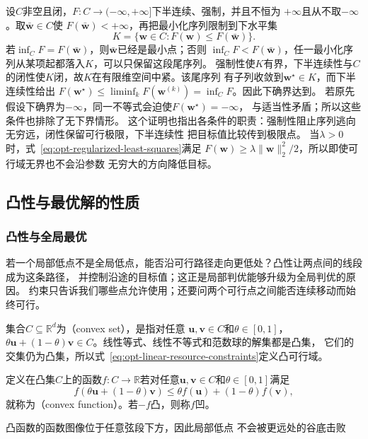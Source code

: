 设$C$非空且闭，$F:C\to(-\infty,+\infty]$下半连续、强制，并且不恒为
$+\infty$且从不取$-\infty$。取$\bar{\bm{w}}\in C$使
$F(\bar{\bm{w}})<+\infty$，再把最小化序列限制到下水平集
\[
  K=\{\bm{w}\in C:F(\bm{w})\leq F(\bar{\bm{w}})\}.
\]
若$\inf_C F=F(\bar{\bm{w}})$，则$\bar{\bm{w}}$已经是最小点；否则
$\inf_C F<F(\bar{\bm{w}})$，任一最小化序列从某项起都落入$K$，可以只保留这段尾序列。
强制性使$K$有界，下半连续性与$C$的闭性使$K$闭，故$K$在有限维空间中紧。该尾序列
有子列收敛到$\bm{w}^{\star}\in K$，而下半连续性给出
$F(\bm{w}^{\star})\leq\liminf_kF(\bm{w}^{(k)})=\inf_C F$。因此下确界达到。
若原先假设下确界为$-\infty$，同一不等式会迫使$F(\bm w^\star)=-\infty$，
与适当性矛盾；所以这些条件也排除了无下界情形。
这个证明也指出各条件的职责：强制性阻止序列逃向无穷远，闭性保留可行极限，下半连续性
把目标值比较传到极限点。
当$\lambda>0$时，式~\eqref{eq:opt-regularized-least-squares}满足
$F(\bm{w})\geq\lambda\lVert\bm{w}\rVert_2^2/2$，所以即使可行域无界也不会沿参数
无穷大的方向降低目标。

\subsection{凸性与最优解的性质}
\label{sec:opt-convexity}

\subsubsection{凸性与全局最优}

若一个局部低点不是全局低点，能否沿可行路径走向更低处？凸性让两点间的线段成为这条路径，
并控制沿途的目标值；这正是局部判优能够升级为全局判优的原因。
约束只告诉我们哪些点允许使用；还要问两个可行点之间能否连续移动而始终可行。
\begin{definition}[凸集与凸函数]
\label{def:opt-convex-set-function}
集合$C\subseteq\mathbb R^d$为（convex set），是指对任意
$\bm{u},\bm{v}\in C$和$\theta\in[0,1]$，
$\theta\bm{u}+(1-\theta)\bm{v}\in C$。线性等式、线性不等式和范数球的解集都是凸集，
它们的交集仍为凸集，所以式~\eqref{eq:opt-linear-resource-constraints}定义凸可行域。

定义在凸集$C$上的函数$f:C\to\mathbb R$若对任意$\bm u,\bm v\in C$和$\theta\in[0,1]$满足
\begin{equation}
  f(\theta\bm{u}+(1-\theta)\bm{v})
  \leq
  \theta f(\bm{u})+(1-\theta)f(\bm{v}),
  \label{eq:opt-convex-function}
\end{equation}
就称为（convex function）。若$-f$凸，则称$f$凹。
\end{definition}
凸函数的函数图像位于任意弦段下方，因此局部低点
不会被更远处的谷底击败

